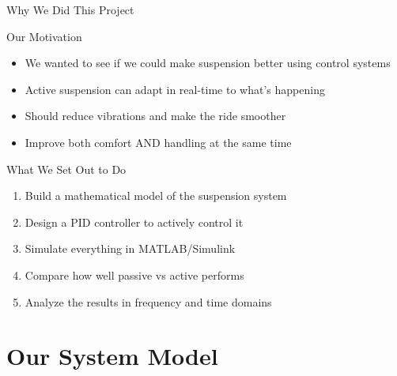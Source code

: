 \documentclass[aspectratio=169]{beamer}
\begin{document}
\begin{frame}{Why We Did This Project}
  \begin{block}{Our Motivation}
    \begin{itemize}
      \item We wanted to see if we could make suspension better using control systems
      \item Active suspension can adapt in real-time to what's happening
      \item Should reduce vibrations and make the ride smoother
      \item Improve both comfort AND handling at the same time
    \end{itemize}
  \end{block}
  
  \vspace{0.3cm}
  
  \begin{block}{What We Set Out to Do}
    \begin{enumerate}
      \item Build a mathematical model of the suspension system
      \item Design a PID controller to actively control it
      \item Simulate everything in MATLAB/Simulink
      \item Compare how well passive vs active performs
      \item Analyze the results in frequency and time domains
    \end{enumerate}
  \end{block}
\end{frame}

\section{Our System Model}
\end{document}
